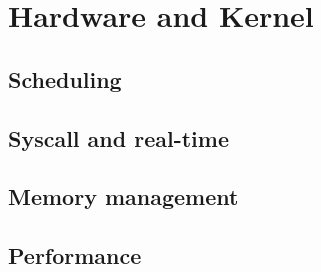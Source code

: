 \section{Hardware and Kernel}
\label{sec:kernel}

\subsection{Scheduling}
\label{subsec:sched}

\subsection{Syscall and real-time}
\label{subsec:rt}

\subsection{Memory management}
\label{subsec:memory}

\subsection{Performance}
\label{subsec:perf}
